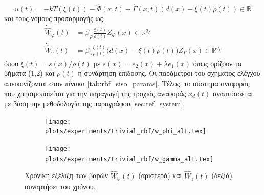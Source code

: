 \begin{equation}
u(t) = -k T(\xi(t)) - \hat{\Phi}(x,t) 
- \hat{\Gamma}(x,t) \left( d(x) - \xi(t) \dot{\rho}(t) \right)
\in \mathbb{R}
\label{eq:siso_rbf_control_input}
\end{equation}
και τους νόμους προσαρμογής ως:
\begin{equation}
\begin{alignedat}{1}
\dot{\hat{W}}_{\varphi}(t) &= 
\beta_{\varphi} \frac{\xi(t)}{\rho(t)} Z_{\Phi}(x) 
\in \mathbb{R}^{q_{\Phi}} \\
\dot{\hat{W}}_{\gamma}(t) &= \beta_{\gamma} \frac{\xi(t)}{\rho(t)}
\big( d(x) - \xi(t) \dot{\rho}(t) \big) Z_{\Gamma}(x)
\in \mathbb{R}^{q_{\Gamma}}
\end{alignedat}
\label{eq:siso_adapt_laws}
\end{equation}
όπου $\xi(t) = s(x)/\rho(t)$ με $s(x) = e_2(x) + \lambda e_1(x)$ όπως ορίζουν τα βήματα (1,2) και $\rho(t)$ η συνάρτηση επίδοσης. Οι παράμετροι του σχήματος ελέγχου απεικονίζονται στον πίνακα \ref{tab:rbf_siso_params}. Τέλος, το σύστημα αναφοράς που χρησιμοποιείται για την παραγωγή της τροχιάς αναφοράς $x_d(t)$ αναπτύσσεται με βάση την μεθοδολογία της παραγράφου \ref{sec:ref_system}.



\begin{figure}
	\begin{subfigure}{0.5\textwidth}
		\texttt{[image: plots/experiments/trivial\_rbf/w\_phi\_alt.tex]}
	\end{subfigure}
	\begin{subfigure}{0.5\textwidth}
		\texttt{[image: plots/experiments/trivial\_rbf/w\_gamma\_alt.tex]}
	\end{subfigure}
	\caption{ Χρονική εξέλιξη των βαρών $\hat{W}_\varphi(t)$ (αριστερά) και $\hat{W}_\gamma(t)$ (δεξιά) συναρτήσει του χρόνου.}
	\label{fig:siso_weights}
\end{figure}

